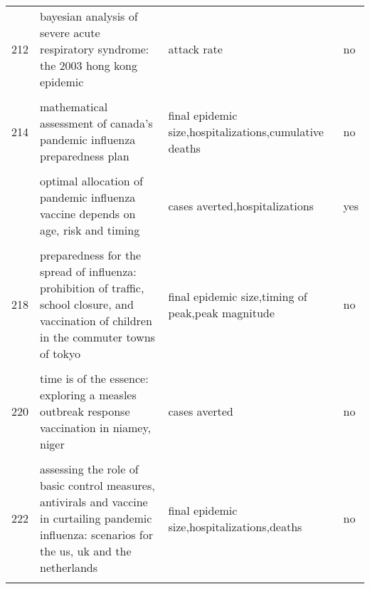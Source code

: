 \documentclass[
]{article}
\begin{document}
\begin{landscape}
\begin{longtable}{l>{\raggedright\arraybackslash}p{4cm}>{\raggedright\arraybackslash}p{6cm}l}
212 & bayesian analysis of severe acute respiratory syndrome: the 2003 hong kong epidemic & attack rate & no\\
\cellcolor{gray!6}{213} & \cellcolor{gray!6}{hepatitis b vaccination and changes in sexual risk behaviour among men who have sex with men in amsterdam} & \cellcolor{gray!6}{cases averted} & \cellcolor{gray!6}{no}\\
214 & mathematical assessment of canada's pandemic influenza preparedness plan & final epidemic size,hospitalizations,cumulative deaths & no\\
\cellcolor{gray!6}{215} & \cellcolor{gray!6}{modeling targeted layered containment of an influenza pandemic in the united states} & \cellcolor{gray!6}{cases averted,attack rate} & \cellcolor{gray!6}{yes}\\
\addlinespace
216 & optimal allocation of pandemic influenza vaccine depends on age, risk and timing & cases averted,hospitalizations & yes\\
\cellcolor{gray!6}{217} & \cellcolor{gray!6}{pandemic simulation of antivirals plus school closures: buying time until strain-specific vaccine is available} & \cellcolor{gray!6}{final epidemic size,timing of peak,attack rate,case fatality} & \cellcolor{gray!6}{no}\\
218 & preparedness for the spread of influenza: prohibition of traffic, school closure, and vaccination of children in the commuter towns of tokyo & final epidemic size,timing of peak,peak magnitude & no\\
\cellcolor{gray!6}{219} & \cellcolor{gray!6}{scenarios of diffusion and control of an influenza pandemic in italy} & \cellcolor{gray!6}{outbreak duration and timing,timing of peak,cumulative attack rate} & \cellcolor{gray!6}{yes}\\
220 & time is of the essence: exploring a measles outbreak response vaccination in niamey, niger & cases averted & no\\
\addlinespace
\cellcolor{gray!6}{221} & \cellcolor{gray!6}{a stochastic equation-based model of the value of international air-travel restrictions for controlling pandemic flu} & \cellcolor{gray!6}{timing of peak,peak magnitude} & \cellcolor{gray!6}{no}\\
222 & assessing the role of basic control measures, antivirals and vaccine in curtailing pandemic influenza: scenarios for the us, uk and the netherlands & final epidemic size,hospitalizations,deaths & no\\
\cellcolor{gray!6}{223} & \cellcolor{gray!6}{deterministic sir (susceptible–infected–removed) models applied to varicella outbreaks} & \cellcolor{gray!6}{cases averted} & \cellcolor{gray!6}{no}\\

\end{longtable}
\end{landscape}
\end{document}
